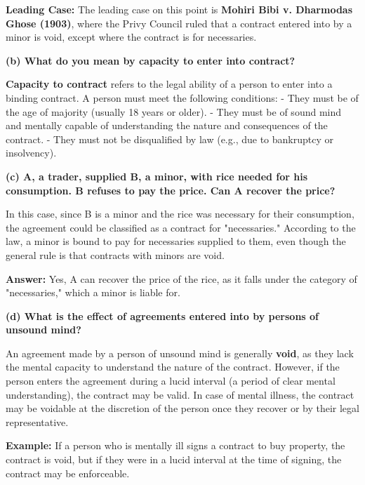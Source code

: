 \documentclass[12pt,a4paper]{book}
\begin{document}
\textbf{Leading Case:}  
The leading case on this point is \textbf{Mohiri Bibi v. Dharmodas Ghose (1903)}, where the Privy Council ruled that a contract entered into by a minor is void, except where the contract is for necessaries.

\vspace{0.5cm}

\textbf{(b) What do you mean by capacity to enter into contract?}

\textbf{Capacity to contract} refers to the legal ability of a person to enter into a binding contract. A person must meet the following conditions:
- They must be of the age of majority (usually 18 years or older).
- They must be of sound mind and mentally capable of understanding the nature and consequences of the contract.
- They must not be disqualified by law (e.g., due to bankruptcy or insolvency).

\vspace{0.5cm}

\textbf{(c) A, a trader, supplied B, a minor, with rice needed for his consumption. B refuses to pay the price. Can A recover the price?}

In this case, since B is a minor and the rice was necessary for their consumption, the agreement could be classified as a contract for "necessaries." According to the law, a minor is bound to pay for necessaries supplied to them, even though the general rule is that contracts with minors are void.

\textbf{Answer:}  
Yes, A can recover the price of the rice, as it falls under the category of "necessaries," which a minor is liable for.

\vspace{0.5cm}

\textbf{(d) What is the effect of agreements entered into by persons of unsound mind?}

An agreement made by a person of unsound mind is generally \textbf{void}, as they lack the mental capacity to understand the nature of the contract. However, if the person enters the agreement during a lucid interval (a period of clear mental understanding), the contract may be valid. In case of mental illness, the contract may be voidable at the discretion of the person once they recover or by their legal representative.

\textbf{Example:}  
If a person who is mentally ill signs a contract to buy property, the contract is void, but if they were in a lucid interval at the time of signing, the contract may be enforceable.
\end{document}
